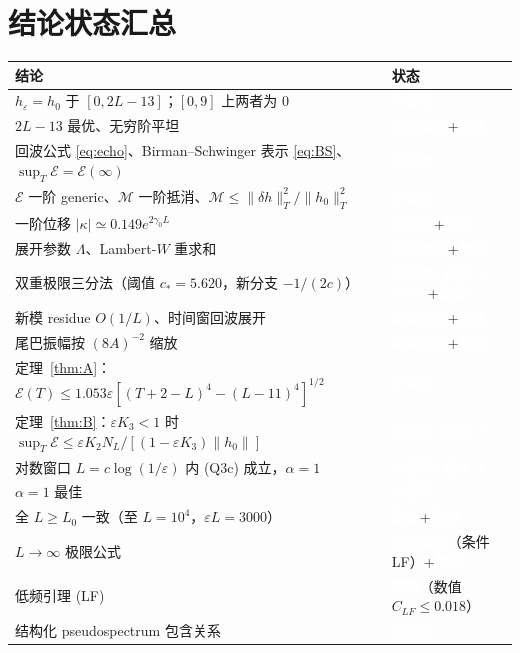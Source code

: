 \documentclass[11pt,a4paper,fontset=windows]{ctexart}
\newcommand{\tagbox}[2]{\begingroup\setlength{\fboxsep}{1.4pt}\colorbox{#1}{\textcolor{white}{\footnotesize\bfseries #2}}\endgroup}
\newcommand{\proven}{\tagbox{green!45!black}{已证明}}
\newcommand{\sketch}{\tagbox{teal!80!black}{证明概要}}
\newcommand{\condJ}{\tagbox{blue!65!black}{已证明\,|\,条件 J}}
\newcommand{\condJa}{\tagbox{blue!65!black}{已证明\,|\,条件 J-asym}}
\newcommand{\exactlow}{\tagbox{violet!80!black}{精确低阶}}
\newcommand{\numer}{\tagbox{orange!85!black}{数值}}
\newcommand{\conj}{\tagbox{red!70!black}{猜想}}
\theoremstyle{definition}
\theoremstyle{definition}
\newcommand{\eps}{\varepsilon}
\newcommand{\cE}{\mathcal E}
\newcommand{\cM}{\mathcal M}
\begin{document}
\section{结论状态汇总}
\begin{table}[h]
\centering\small
\begin{tabularx}{\textwidth}{@{}>{\raggedright\arraybackslash}Xl@{}}
\toprule
结论 & 状态\\\midrule
$h_\eps=h_0$ 于 $[0,2L-13]$；$[0,9]$ 上两者为 0 & \proven\\
$2L-13$ 最优、无穷阶平坦 & \sketch+\numer\\
回波公式 \eqref{eq:echo}、Birman--Schwinger 表示 \eqref{eq:BS}、$\sup_T\cE=\cE(\infty)$ & \proven\\
$\cE$ 一阶 generic、$\cM$ 一阶抵消、$\cM\le\|\delta h\|_T^2/\|h_0\|_T^2$ & \proven\\
一阶位移 $|\kappa|\simeq0.149e^{2\gamma_0L}$ & \proven+\numer\\
展开参数 $\Lambda$、Lambert-$W$ 重求和 & \sketch+\numer\\
双重极限三分法（阈值 $c_*=5.620$，新分支 $-1/(2c)$） & \condJa+\numer\\
新模 residue $O(1/L)$、时间窗回波展开 & \exactlow+\numer\\
尾巴振幅按 $(8A)^{-2}$ 缩放 & \exactlow+\conj\\
定理~\ref{thm:A}：$\cE(T)\le1.053\eps[(T+2-L)^4-(L-11)^4]^{1/2}$ & \proven\\
定理~\ref{thm:B}：$\eps K_3<1$ 时 $\sup_T\cE\le\eps K_2N_L/[(1-\eps K_3)\|h_0\|]$ & \condJ\\
对数窗口 $L=c\log(1/\eps)$ 内 (Q3c) 成立，$\alpha=1$ & \condJ\\
$\alpha=1$ 最佳 & \proven\\
全 $L\ge L_0$ 一致（至 $L=10^4$，$\eps L=3000$） & \numer+\conj\\
$L\to\infty$ 极限公式 & \sketch（条件 LF）+\numer\\
低频引理 (LF) & \conj（数值 $C_{LF}\le0.018$）\\
结构化 pseudospectrum 包含关系 & \proven\\\bottomrule
\end{tabularx}
\end{table}
\end{document}
